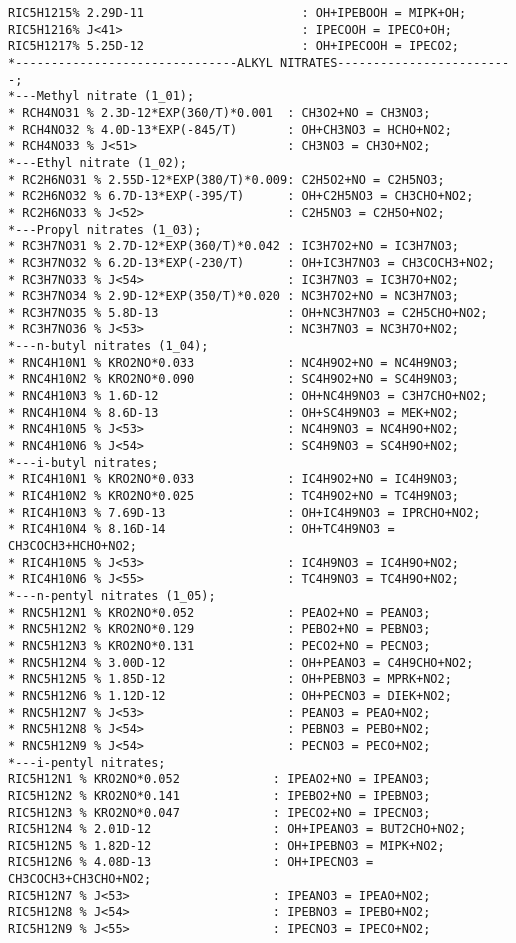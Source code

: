 \begin{verbatim}
RIC5H1215% 2.29D-11                      : OH+IPEBOOH = MIPK+OH;
RIC5H1216% J<41>                         : IPECOOH = IPECO+OH;
RIC5H1217% 5.25D-12                      : OH+IPECOOH = IPECO2;
*-------------------------------ALKYL NITRATES-------------------------;
*---Methyl nitrate (1_01);
* RCH4NO31 % 2.3D-12*EXP(360/T)*0.001  : CH3O2+NO = CH3NO3;
* RCH4NO32 % 4.0D-13*EXP(-845/T)       : OH+CH3NO3 = HCHO+NO2;
* RCH4NO33 % J<51>                     : CH3NO3 = CH3O+NO2; 
*---Ethyl nitrate (1_02);
* RC2H6NO31 % 2.55D-12*EXP(380/T)*0.009: C2H5O2+NO = C2H5NO3;
* RC2H6NO32 % 6.7D-13*EXP(-395/T)      : OH+C2H5NO3 = CH3CHO+NO2;
* RC2H6NO33 % J<52>                    : C2H5NO3 = C2H5O+NO2;
*---Propyl nitrates (1_03);
* RC3H7NO31 % 2.7D-12*EXP(360/T)*0.042 : IC3H7O2+NO = IC3H7NO3;
* RC3H7NO32 % 6.2D-13*EXP(-230/T)      : OH+IC3H7NO3 = CH3COCH3+NO2;
* RC3H7NO33 % J<54>                    : IC3H7NO3 = IC3H7O+NO2;
* RC3H7NO34 % 2.9D-12*EXP(350/T)*0.020 : NC3H7O2+NO = NC3H7NO3;
* RC3H7NO35 % 5.8D-13                  : OH+NC3H7NO3 = C2H5CHO+NO2;
* RC3H7NO36 % J<53>                    : NC3H7NO3 = NC3H7O+NO2;
*---n-butyl nitrates (1_04);
* RNC4H10N1 % KRO2NO*0.033             : NC4H9O2+NO = NC4H9NO3;
* RNC4H10N2 % KRO2NO*0.090             : SC4H9O2+NO = SC4H9NO3;
* RNC4H10N3 % 1.6D-12                  : OH+NC4H9NO3 = C3H7CHO+NO2;
* RNC4H10N4 % 8.6D-13                  : OH+SC4H9NO3 = MEK+NO2;
* RNC4H10N5 % J<53>                    : NC4H9NO3 = NC4H9O+NO2;
* RNC4H10N6 % J<54>                    : SC4H9NO3 = SC4H9O+NO2;
*---i-butyl nitrates;
* RIC4H10N1 % KRO2NO*0.033             : IC4H9O2+NO = IC4H9NO3;
* RIC4H10N2 % KRO2NO*0.025             : TC4H9O2+NO = TC4H9NO3;
* RIC4H10N3 % 7.69D-13                 : OH+IC4H9NO3 = IPRCHO+NO2;
* RIC4H10N4 % 8.16D-14                 : OH+TC4H9NO3 = CH3COCH3+HCHO+NO2;
* RIC4H10N5 % J<53>                    : IC4H9NO3 = IC4H9O+NO2;
* RIC4H10N6 % J<55>                    : TC4H9NO3 = TC4H9O+NO2;
*---n-pentyl nitrates (1_05);
* RNC5H12N1 % KRO2NO*0.052             : PEAO2+NO = PEANO3;
* RNC5H12N2 % KRO2NO*0.129             : PEBO2+NO = PEBNO3;
* RNC5H12N3 % KRO2NO*0.131             : PECO2+NO = PECNO3;
* RNC5H12N4 % 3.00D-12                 : OH+PEANO3 = C4H9CHO+NO2;
* RNC5H12N5 % 1.85D-12                 : OH+PEBNO3 = MPRK+NO2;
* RNC5H12N6 % 1.12D-12                 : OH+PECNO3 = DIEK+NO2;
* RNC5H12N7 % J<53>                    : PEANO3 = PEAO+NO2;
* RNC5H12N8 % J<54>                    : PEBNO3 = PEBO+NO2;
* RNC5H12N9 % J<54>                    : PECNO3 = PECO+NO2;
*---i-pentyl nitrates;
RIC5H12N1 % KRO2NO*0.052             : IPEAO2+NO = IPEANO3;
RIC5H12N2 % KRO2NO*0.141             : IPEBO2+NO = IPEBNO3;
RIC5H12N3 % KRO2NO*0.047             : IPECO2+NO = IPECNO3;
RIC5H12N4 % 2.01D-12                 : OH+IPEANO3 = BUT2CHO+NO2;
RIC5H12N5 % 1.82D-12                 : OH+IPEBNO3 = MIPK+NO2;
RIC5H12N6 % 4.08D-13                 : OH+IPECNO3 = CH3COCH3+CH3CHO+NO2;
RIC5H12N7 % J<53>                    : IPEANO3 = IPEAO+NO2;
RIC5H12N8 % J<54>                    : IPEBNO3 = IPEBO+NO2;
RIC5H12N9 % J<55>                    : IPECNO3 = IPECO+NO2;
\end{verbatim}